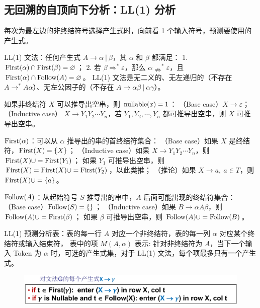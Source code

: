 \subsection*{无回溯的自顶向下分析：LL(1) 分析}
\par \noindent 每次为最左边的非终结符号选择产生式时，向前看 1 个输入符号，预测要使用的产生式。
\par \noindent LL(1) 文法：任何产生式 $A \rightarrow \alpha\ |\ \beta$，其 $\alpha$ 和 $\beta$ 都满足：
1. $\operatorname{First}(\alpha) \cap \operatorname{First}(\beta) = \varnothing$；
2. 若 $\beta \Rightarrow^* \varepsilon$，那么 $\alpha \nRightarrow^* \varepsilon$，且 $\operatorname{First}(\alpha) \cap \operatorname{Follow}(A) = \varnothing$。
LL(1) 文法是无二义的、无左递归的（不存在 $A \rightarrow^* A\alpha$）、无左公因子的（不存在 $A \rightarrow \alpha\beta\ |\ \alpha\gamma$）。

\par \noindent 如果非终结符 $X$ 可以推导出空串，则 $\operatorname{nullable}(x) = 1$：
（Base case）$X \rightarrow \varepsilon$；
（Inductive case） $X \rightarrow Y_1Y_2\cdots Y_n$，若 $Y_1, Y_2, \cdots, Y_n$ 都可推导出空串，则 $X$ 可推导出空串。

\par \noindent $\operatorname{First}(\alpha)$：可以从 $\alpha$ 推导出的串的首终结符集合：
（Base case）如果 $X$ 是终结符，$\operatorname{First}(X) = \{X\}$；
（Inductive case）如果 $X \rightarrow Y_1Y_2\cdots Y_n$，则 $\operatorname{First}(X) \cup = \operatorname{First}(Y_1)$；
如果 $Y_1$ 可推导出空串，则 $\operatorname{First}(X) = \operatorname{First}(X) \cup =  \operatorname{First}(Y_2)$，以此类推；
（推论）如果 $X \rightarrow a,\ a\in T$，则 $\operatorname{First}(X) \cup =\{a\}$。

\par \noindent $\operatorname{Follow}(A)$：从起始符号 $S$ 推导出的串中，$A$ 后面可能出现的终结符集合：
（Base case）$\operatorname{Follow}(S) = \{\}$；
（Inductive case）如果 $B \rightarrow \alpha A \beta$，则 $\operatorname{Follow}(A) \cup = \operatorname{First}(\beta)$；
如果 $\beta$ 可推导出空串，则 $\operatorname{Follow}(A) \cup = \operatorname{Follow}(B)$。

\par \noindent LL(1) 预测分析表：表的每一行 $A$ 对应一个非终结符，表的每一列 $\alpha$ 对应某个终结符或输入结束符，
表中的项 $M(A, \alpha)$ 表示: 针对非终结符为 $A$，当下一个输入 Token 为 $\alpha$ 时，可选的产生式集，对于 LL(1) 文法，每个项最多只有一个产生式。

\begin{figure}[H]
    \centering
    \includegraphics[width=\linewidth]{figures/LL1.png}
\end{figure}

